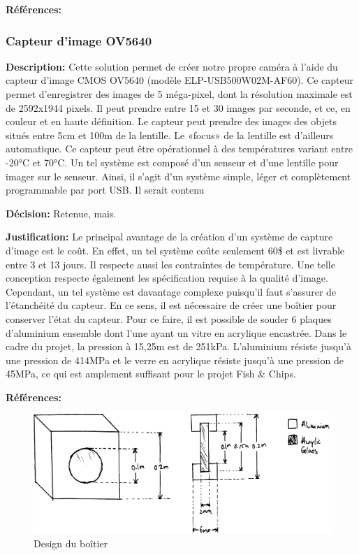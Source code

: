 \textbf{Références:} \cite{GoFishCam} 


\subsubsection{Capteur d'image OV5640}
\label{subsubsection:camera_custom}

\textbf{Description:} Cette solution permet de créer notre propre caméra à l'aide du capteur d'image CMOS OV5640 (modèle ELP-USB500W02M-AF60). Ce capteur permet d'enregistrer des images de 5 méga-pixel, dont la résolution maximale est de 2592x1944 pixels. Il peut prendre entre 15 et 30 images par seconde, et ce, en couleur et en haute définition. Le capteur peut prendre des images des objets situés entre 5cm et 100m de la lentille. Le «focus» de la lentille est d'ailleurs automatique. Ce capteur peut être opérationnel à des températures variant entre -20°C et 70°C. Un tel système est composé d'un senseur et d'une lentille pour imager sur le senseur. Ainsi, il s'agit d'un système simple, léger et complètement programmable par port USB. Il serait contenu  \vspace{5mm}

\textbf{Décision:} Retenue, mais. \vspace{5mm}

\textbf{Justification:} Le principal avantage de la création d'un système de capture d'image est le coût. En effet, un tel système coûte seulement 60\$ et est livrable entre 3 et 13 jours. Il respecte aussi les contraintes de température. Une telle conception respecte également les spécification requise à la qualité d'image. Cependant, un tel système est davantage complexe puisqu'il faut s'assurer de l'étanchéité du capteur. En ce sens, il est nécessaire de créer une boîtier pour conserver l'état du capteur. Pour ce faire, il est possible de souder 6 plaques d'aluminium ensemble dont l'une ayant un vitre en acrylique encastrée. Dans le cadre du projet, la pression à 15,25m est de 251kPa. L'aluminium résiste jusqu'à une pression de 414MPa et le verre en acrylique résiste jusqu'à une pression de 45MPa, ce qui est amplement suffisant pour le projet Fish \& Chips. \vspace{5mm}

\textbf{Références:} \cite{OV5640} \cite{OV5640_coûts} \cite{ASM} \cite{Glass}


\begin{figure}[!htb]
    \centering
    \includegraphics[width=0.85\linewidth]{fig/camera_custom_boitier_vect.png}
    \caption{Design du boîtier}
    \label{fig:boitier_camera_custom}
\end{figure}

